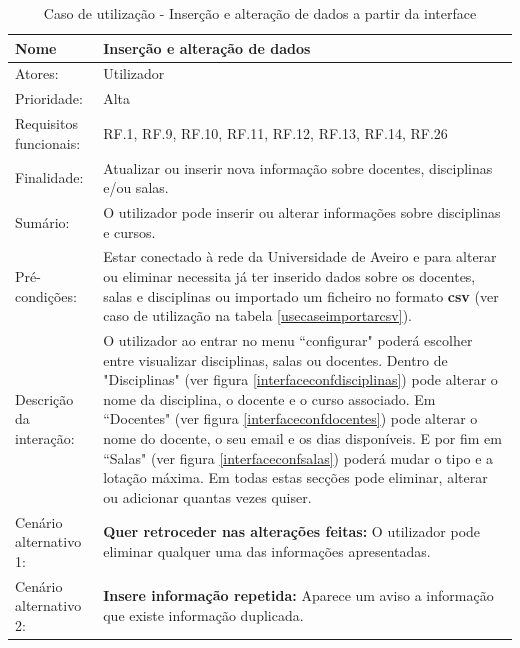 \documentclass[11pt, twoside]{report}
\begin{document}
	\def\arraystretch{1.5}
\begin{table}[H]
	\caption{Caso de utilização - Inserção e alteração de dados a partir da interface}
	\begin{center}	
		\begin{tabularx}{\textwidth}{|l|X|}
			\hline
			\textbf{Nome }	& \textbf{Inserção e alteração de dados} \\
			\hline
			Atores: & Utilizador \\
			\hline
			Prioridade: & Alta \\
			\hline
			Requisitos funcionais:& RF.1, RF.9, RF.10, RF.11, RF.12, RF.13, RF.14, RF.26 \\
			\hline
			Finalidade: & Atualizar ou inserir nova informação sobre docentes, disciplinas e/ou salas.\\
			\hline
			Sumário: &  O utilizador pode inserir ou alterar informações sobre disciplinas e cursos.\\
			\hline
			Pré-condições: & Estar conectado à rede da Universidade de Aveiro e para alterar ou eliminar necessita já ter inserido dados sobre os docentes, salas e disciplinas ou importado um ficheiro no formato \textbf{csv} (ver caso de utilização na tabela \ref{usecaseimportarcsv}).\\
			\hline
			Descrição da interação: &  O utilizador ao entrar no menu ``configurar" poderá escolher entre visualizar disciplinas, salas ou docentes. Dentro de "Disciplinas" (ver figura \ref{interfaceconfdisciplinas}) pode alterar o nome da disciplina, o docente e o curso associado.
			Em ``Docentes" (ver figura \ref{interfaceconfdocentes}) pode alterar o nome do docente, o seu email e os dias disponíveis.
			E por fim em ``Salas" (ver figura \ref{interfaceconfsalas}) poderá mudar o tipo e a lotação máxima.
			Em todas estas secções pode eliminar, alterar ou adicionar quantas vezes quiser.\\
			\hline
			Cenário alternativo 1:&\textbf{Quer retroceder nas alterações feitas:} O utilizador pode eliminar qualquer uma das informações apresentadas.\\
			\hline
			Cenário alternativo 2:&\textbf{Insere informação repetida:} Aparece um aviso a informação que existe informação duplicada.\\
			\hline
		\end{tabularx}
	\end{center}
\end{table}
\end{document}
